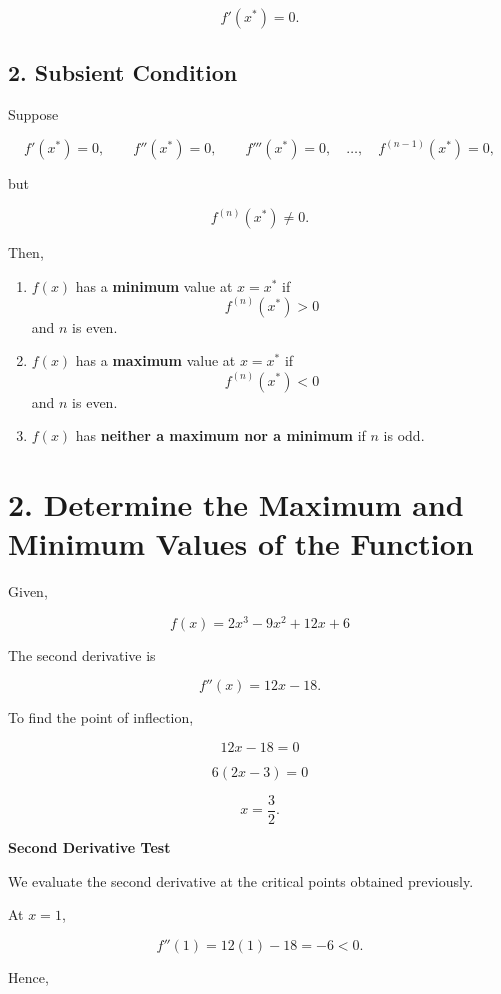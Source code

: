 \documentclass{article}
\begin{document}
\[
\boxed{f'(x^*)=0.}
\]

\vspace{0.5cm}

\subsection*{2. Subsient Condition}

Suppose

\[
f'(x^*)=0,\qquad
f''(x^*)=0,\qquad
f'''(x^*)=0,\quad \ldots,\quad
f^{(n-1)}(x^*)=0,
\]

but

\[
f^{(n)}(x^*)\neq0.
\]

Then,

\begin{enumerate}
    \item $f(x)$ has a \textbf{minimum} value at $x=x^*$ if
    \[
    f^{(n)}(x^*)>0
    \]
    and $n$ is even.

    \item $f(x)$ has a \textbf{maximum} value at $x=x^*$ if
    \[
    f^{(n)}(x^*)<0
    \]
    and $n$ is even.

    \item $f(x)$ has \textbf{neither a maximum nor a minimum} if $n$ is odd.
\end{enumerate}

\section*{2. Determine the Maximum and Minimum Values of the Function}

Given,

\[
f(x)=2x^3-9x^2+12x+6
\]

The second derivative is

\[
f''(x)=12x-18.
\]

To find the point of inflection,

\[
12x-18=0
\]

\[
6(2x-3)=0
\]

\[
x=\frac{3}{2}.
\]

\vspace{0.5cm}

\textbf{Second Derivative Test}

We evaluate the second derivative at the critical points obtained previously.

At $x=1$,

\[
f''(1)=12(1)-18=-6<0.
\]

Hence,
\end{document}
